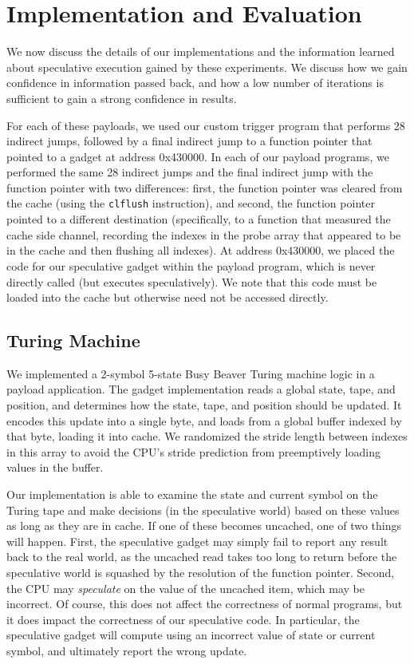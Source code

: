 
\section{Implementation and Evaluation}
We now discuss the details of our implementations and the information learned
about speculative execution gained by these experiments. We discuss how we gain
confidence in information passed back, and how a low number of iterations is
sufficient to gain a strong confidence in results.

For each of these payloads, we used our custom trigger program that performs 28
indirect jumps, followed by a final indirect jump to a function pointer that
pointed to a gadget at address 0x430000. In each of our payload programs,
we performed the same 28 indirect jumps and the final indirect jump with the
function pointer with two differences: first, the function pointer was cleared
from the cache (using the \texttt{clflush} instruction), and second, the
function pointer pointed to a different destination (specifically, to a
function
that measured the cache side channel, recording the indexes in the probe array
that appeared to be in the cache and then flushing all indexes).
At address 0x430000, we placed the code for our speculative gadget within the 
payload program, which is never directly called
(but executes speculatively). We note that this code must be loaded into the
cache but otherwise need not be accessed directly.


\subsection{Turing Machine}
\label{subsec:impl-turing}

We implemented a 2-symbol 5-state Busy Beaver Turing machine logic in a  
payload application. The gadget implementation reads a global state,
tape, and position, and determines how the state, tape, and position should be
updated. It encodes this update into a single byte, and loads from a global
buffer indexed by that byte, loading it into cache.
We randomized the stride length between indexes in
this array to avoid the CPU's stride prediction from preemptively loading values
in the buffer.


Our implementation is able to examine the state and current symbol on the Turing
tape and make decisions (in the speculative world) based on these values as long
as they are in cache. If one of these becomes uncached, one of two things will
happen. First, the speculative gadget may simply fail to report any result back
to the real world, as the uncached read takes too long to return before the
speculative world is squashed by the resolution of the function pointer. Second,
the CPU may \emph{speculate} on the value of the uncached item, which may be
incorrect. Of course, this does not affect the correctness of normal programs,
but it does impact the correctness of our speculative code. In particular, the
speculative gadget will compute using an incorrect value of state or current
symbol, and ultimately report the wrong update.


